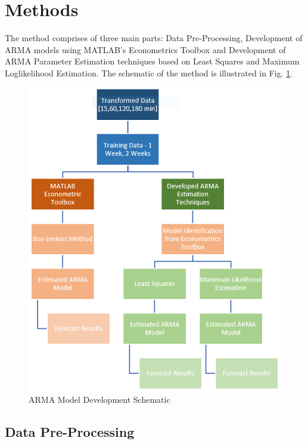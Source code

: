 \documentclass[journal]{IEEEtran}
\begin{document}
\section{Methods}

The method comprises of three main parts:  Data Pre-Processing, Development of ARMA models using MATLAB's Econometrics Toolbox and Development of ARMA Parameter Estimation techniques based on Least Squares and Maximum Loglikelihood Estimation. The schematic of the method is illustrated in Fig. \ref{fig1}.

\begin{figure}[htpb]
\centering
\includegraphics[scale=0.4]{ObjectivesSchematic.png}
\caption{ARMA Model Development Schematic}
\label{fig1} %
\end{figure}

\subsection{Data Pre-Processing}
\end{document}
